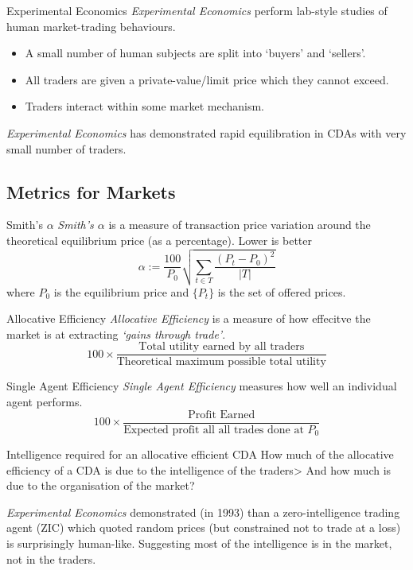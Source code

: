 \documentclass[11pt,a4paper]{article}
\begin{document}
  \begin{definition}{Experimental Economics}
    \textit{Experimental Economics} perform lab-style studies of human market-trading behaviours.
    \begin{itemize}
      \item A small number of human subjects are split into `buyers' and `sellers'.
      \item All traders are given a private-value/limit price which they cannot exceed.
      \item Traders interact within some market mechanism.
    \end{itemize}
    \textit{Experimental Economics} has demonstrated rapid equilibration in CDAs with very small number of traders.
  \end{definition}

\subsection{Metrics for Markets}

  \begin{definition}{Smith's $\alpha$}
    \textit{Smith's $\alpha$} is a measure of transaction price variation around the theoretical equilibrium price (as a percentage). Lower is better
    \[ \alpha:=\frac{100}{P_0}\sqrt{\sum_{t\in T}\frac{(P_t-P_0)^2}{|T|}} \]
    where $P_0$ is the equilibrium price and $\{P_t\}$ is the set of offered prices.
  \end{definition}

  \begin{definition}{Allocative Efficiency}
    \textit{Allocative Efficiency} is a measure of how effecitve the market is at extracting \textit{`gains through trade'}.
    \[ 100\times\frac{\text{Total utility earned by all traders}}{\text{Theoretical maximum possible total utility}} \]
  \end{definition}

  \begin{definition}{Single Agent Efficiency}
    \textit{Single Agent Efficiency} measures how well an individual agent performs.
    \[ 100\times\frac{\text{Profit Earned}}{\text{Expected profit all all trades done at }P_0} \]
  \end{definition}

  \begin{proposition}{Intelligence required for an allocative efficient CDA}
    How much of the allocative efficiency of a CDA is due to the intelligence of the traders> And how much is due to the organisation of the market?
    \par \textit{Experimental Economics} demonstrated (in 1993) than a zero-intelligence trading agent (ZIC) which quoted random prices (but constrained not to trade at a loss) is surprisingly human-like. Suggesting most of the intelligence is in the market, not in the traders.
  \end{proposition}
\end{document}
